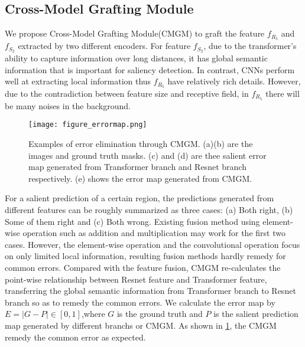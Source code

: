 \documentclass[10pt,twocolumn,letterpaper]{article}
\begin{document}
\subsection{Cross-Model Grafting Module}
We propose Cross-Model Grafting Module(CMGM) to graft the feature $f_{{R}_5}$ and $f_{{S}_2}$ extracted by two different encoders. For feature $f_{{S}_2}$, due to the transformer's ability to capture information over long distances, it has global semantic information that is important for saliency detection. In contrast, CNNs perform well at extracting local information thus $f_{{R}_5}$ have relatively rich details. However, due to the contradiction between feature size and receptive field, in $f_{{R}_5}$ there will be many noises in the background.
\begin{figure}[t]
\centering
\texttt{[image: figure\_errormap.png]}
\caption{Examples of error elimination through CMGM. (a)(b) are the images and ground truth masks. (c) and (d) are thee salient error map generated from Transformer branch and Resnet branch respectively. (e) shows the error map generated from CMGM.}
\label{fig:cmgm:errormap}
\end{figure}
For a salient prediction of a certain region, the predictions generated from different features can be
roughly summarized as three cases: (a) Both right, (b) Some of them right and (c) Both wrong. Existing fusion method using element-wise operation such as addition and multiplication may work for the first two cases. However, the element-wise operation and the convolutional operation focus on only limited local information, resulting fusion methods hardly remedy for common errors. Compared with the feature fusion, 
CMGM re-calculates the point-wise relationship between Resnet feature and Transformer feature, transferring the global semantic information from Transformer branch to Resnet branch so as to remedy the common errors. We calculate the error map by ${E}=|G-P| \in [0,1]$,where $G$ is the ground truth and $P$ is the salient prediction map generated by different branchs or CMGM. As shown in \cref{fig:cmgm:errormap}, the CMGM remedy the common error as expected.
\end{document}
